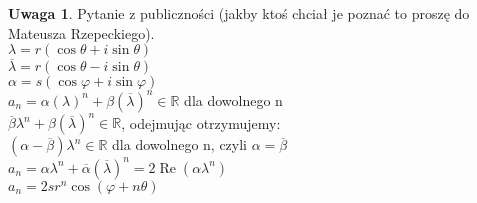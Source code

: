 \documentclass[10pt]{article}
\theoremstyle{definition}
\theoremstyle{definition}
\theoremstyle{definition}
\theoremstyle{definition}
\theoremstyle{remark}
\theoremstyle{definition}
\newtheorem*{uw}{Uwaga}
\theoremstyle{definition}
\theoremstyle{definition}
\theoremstyle{definition}
\theoremstyle{definition}
\begin{document}
\begin{uw} Pytanie z publiczności (jakby ktoś chciał je poznać to proszę do Mateusza Rzepeckiego).\\
    $\lambda = r(\cos\theta + i\sin\theta)$ \\ 
    $\overline\lambda = r(\cos\theta-i\sin\theta)$ \\ 
    $ \alpha = s(\cos\varphi + i\sin\varphi)$ \\ 
    $a_n = \alpha (\lambda)^n + \beta (\overline\lambda)^n \in \mathbb{R}$ dla dowolnego n \\
    $\overline\beta \lambda^n + \beta(\overline\lambda)^n \in \mathbb{R}$, odejmując otrzymujemy: \\ 
    $(\alpha - \overline\beta) \lambda^n \in \mathbb{R}$ dla dowolnego n, czyli $\alpha = \overline\beta$\\ 
    $a_n = \alpha \lambda^n + \overline\alpha (\overline\lambda)^n = 2 \operatorname{Re}(\alpha\lambda^n)$ \\ 
    $a_n = 2sr^n \cos(\varphi + n\theta)$
\end{uw} 
\end{document}
